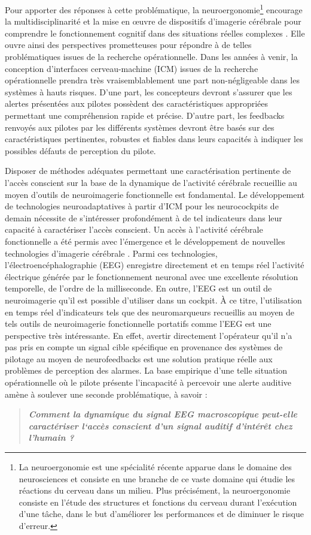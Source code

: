 Pour apporter des réponses à cette problématique, la neuroergonomie\footnote{La neuroergonomie est une spécialité récente apparue dans le domaine des neurosciences et consiste en une branche de ce vaste domaine qui étudie les réactions du cerveau dans un milieu. Plus précisément, la neuroergonomie consiste en l'étude des structures et fonctions du cerveau durant l'exécution d'une tâche, dans le but d'améliorer les performances et de diminuer le risque d'erreur.} encourage la multidisciplinarité et la mise en œuvre de dispositifs d'imagerie cérébrale pour comprendre le fonctionnement cognitif dans des situations réelles complexes \citep{parasuraman2008neuroergonomics}. 
Elle ouvre ainsi des perspectives prometteuses pour répondre à de telles problématiques issues de la recherche opérationnelle. 
Dans les années à venir, la conception d'interfaces cerveau-machine (ICM) issues de la recherche opérationnelle prendra très vraisemblablement une part non-négligeable dans les systèmes à hauts risques.
D'une part, les concepteurs devront s'assurer que les alertes présentées aux pilotes possèdent des caractéristiques appropriées permettant une compréhension rapide et précise. 
D'autre part, les feedbacks renvoyés aux pilotes par les différents systèmes devront être basés sur des caractéristiques pertinentes, robustes et fiables dans leurs capacités à indiquer les possibles défauts de perception du pilote. 

Disposer de méthodes adéquates permettant une caractérisation pertinente de l'accès conscient sur la base de la dynamique de l'activité cérébrale recueillie au moyen d'outils de neuroimagerie fonctionnelle est fondamental. 
Le développement de technologies neuroadaptatives à partir d'ICM pour les neurocockpits de demain nécessite de s'intéresser profondément à de tel indicateurs dans leur capacité à caractériser l'accès conscient.
Un accès à l'activité cérébrale fonctionnelle a été permis avec l'émergence et le développement de nouvelles technologies d’imagerie cérébrale \citep{cohen2010brain}. 
Parmi ces technologies, l’électroencéphalographie (EEG) enregistre directement et en temps réel l’activité électrique générée par le fonctionnement neuronal avec une excellente résolution temporelle, de l’ordre de la milliseconde. 
En outre, l'EEG est un outil de neuroimagerie qu'il est possible d'utiliser dans un cockpit. 
À ce titre, l'utilisation en temps réel d'indicateurs tels que des neuromarqueurs recueillis au moyen de tels outils de neuroimagerie fonctionnelle portatifs comme l'EEG est une perspective très intéressante. 
En effet, avertir directement l'opérateur qu'il n'a pas pris en compte un signal cible spécifique en provenance des systèmes de pilotage au moyen de neurofeedbacks est une solution pratique réelle aux problèmes de perception des alarmes. 
La base empirique d'une telle situation opérationnelle où le pilote présente l'incapacité à percevoir une alerte auditive amène à soulever une seconde problématique, à savoir :
\begin{quote}
\textit{\textbf{Comment la dynamique du signal EEG macroscopique peut-elle caractériser l`accès conscient d'un signal auditif d'intérêt chez l'humain ? }}
\end{quote}

